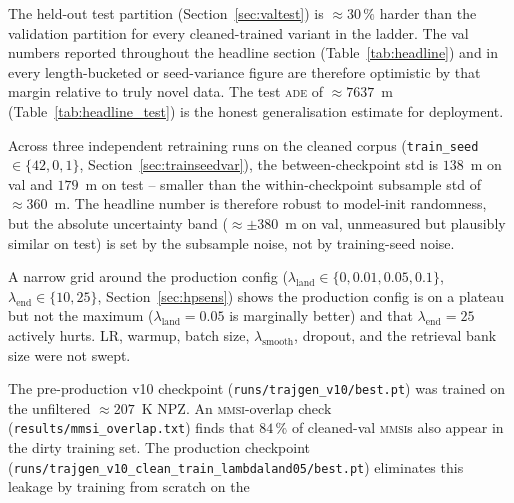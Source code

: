\documentclass[oneside, a4paper, onecolumn, 11pt]{article}
\newcommand{\ade}{\textsc{ade}}
\begin{document}
\begin{description}[leftmargin=*,style=nextline]
  \item[Val-to-test optimism gap.]
        The held-out test partition (Section~\ref{sec:valtest}) is
        $\approx 30\,\%$ harder than the validation partition for
        every cleaned-trained variant in the ladder.  The val
        numbers reported throughout the headline section
        (Table~\ref{tab:headline}) and in every length-bucketed or
        seed-variance figure are therefore optimistic by that margin
        relative to truly novel data.  The test \ade{} of
        $\approx 7637$~m (Table~\ref{tab:headline_test}) is the
        honest generalisation estimate for deployment.
  \item[Training-seed variance is small but measured.]
        Across three independent retraining runs on the cleaned corpus
        (\texttt{train\_seed} $\in \{42, 0, 1\}$,
        Section~\ref{sec:trainseedvar}), the between-checkpoint std is
        $138$~m on val and $179$~m on test -- smaller than the
        within-checkpoint subsample std of $\approx 360$~m.  The
        headline number is therefore robust to model-init randomness,
        but the absolute uncertainty band ($\approx \pm 380$~m on val,
        unmeasured but plausibly similar on test) is set by the
        subsample noise, not by training-seed noise.
  \item[Hyperparameter search was minimal.]
        A narrow grid around the production config
        ($\lambda_{\mathrm{land}} \in \{0, 0.01, 0.05, 0.1\}$,
        $\lambda_{\mathrm{end}} \in \{10, 25\}$,
        Section~\ref{sec:hpsens}) shows the production config is on a
        plateau but not the maximum
        ($\lambda_{\mathrm{land}} = 0.05$ is marginally better) and
        that $\lambda_{\mathrm{end}} = 25$ actively hurts.  LR, warmup,
        batch size, $\lambda_{\mathrm{smooth}}$, dropout, and the
        retrieval bank size were not swept.
  \item[Cross-corpus MMSI leakage in the original v10 checkpoint.]
        The pre-production v10 checkpoint
        (\texttt{runs/trajgen\_v10/best.pt}) was trained on the
        unfiltered $\approx 207$~K NPZ.  An \textsc{mmsi}-overlap
        check (\texttt{results/mmsi\_overlap.txt}) finds that
        $84\,\%$ of cleaned-val \textsc{mmsi}s also appear in the
        dirty training set.  The production checkpoint
        (\texttt{runs/trajgen\_v10\_clean\_train\_lambdaland05/best.pt})
        eliminates this leakage by training from scratch on the

\end{description}
\end{document}
